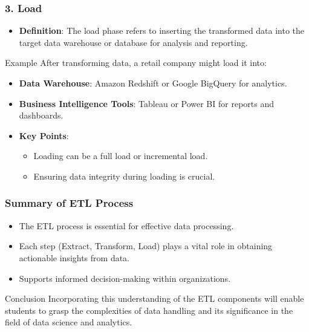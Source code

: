 \documentclass[aspectratio=169]{beamer}
\begin{document}
\begin{frame}[fragile]
    \frametitle{3. Load}
    \begin{itemize}
        \item \textbf{Definition}: The load phase refers to inserting the transformed data into the target data warehouse or database for analysis and reporting.
    \end{itemize}

    \begin{block}{Example}
        After transforming data, a retail company might load it into:
        \begin{itemize}
            \item \textbf{Data Warehouse}: Amazon Redshift or Google BigQuery for analytics.
            \item \textbf{Business Intelligence Tools}: Tableau or Power BI for reports and dashboards.
        \end{itemize}
    \end{block}

    \begin{itemize}
        \item \textbf{Key Points}:
        \begin{itemize}
            \item Loading can be a full load or incremental load.
            \item Ensuring data integrity during loading is crucial.
        \end{itemize}
    \end{itemize}
\end{frame}

\begin{frame}[fragile]
    \frametitle{Summary of ETL Process}
    \begin{itemize}
        \item The ETL process is essential for effective data processing. 
        \item Each step (Extract, Transform, Load) plays a vital role in obtaining actionable insights from data.
        \item Supports informed decision-making within organizations.
    \end{itemize}
    
    \begin{block}{Conclusion}
        Incorporating this understanding of the ETL components will enable students to grasp the complexities of data handling and its significance in the field of data science and analytics.
    \end{block}
\end{frame}
\end{document}
